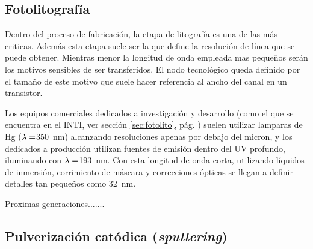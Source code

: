 		\subsection{Fotolitografía}

		Dentro del proceso de fabricación, la etapa de litografía es una de las más criticas. Además esta etapa suele ser la que define la resolución de línea que se puede obtener. Mientras menor la longitud de onda empleada mas pequeños serán los motivos sensibles de ser transferidos. El nodo tecnológico queda definido por el tamaño de este motivo que suele hacer referencia al ancho del canal en un transistor.

		Los equipos comerciales dedicados a investigación y desarrollo (como el que se encuentra en el INTI, ver sección \ref{sec:fotolito}, pág. \pageref{sec:fotolito}) suelen utilizar lamparas de Hg ($\lambda\index{longitud de onda}=$\SI{350}{\nm}) alcanzando resoluciones apenas por debajo del micron, y los dedicados a producción utilizan fuentes de emisión dentro del UV profundo, iluminando con $\lambda\index{longitud de onda}=$\SI{193}{\nm}. Con esta longitud de onda corta, utilizando líquidos de inmersión, corrimiento de máscara y correcciones ópticas se llegan a definir detalles tan pequeños como \SI{32}{\nm}.

		Proximas generaciones.......







		\subsection{Pulverización catódica (\textit{sputtering})}

		






